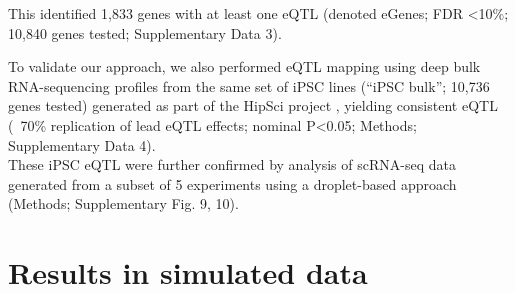 This identified 1,833 genes with at least one eQTL (denoted eGenes; FDR <10\%; 10,840 genes tested; Supplementary Data 3). 


To validate our approach, we also performed eQTL mapping using deep bulk RNA-sequencing profiles from the same set of iPSC lines (“iPSC bulk”; 10,736 genes tested) generated as part of the HipSci project \cite{kilpinen2017common}, yielding consistent eQTL (~70\% replication of lead eQTL effects; nominal P<0.05; Methods; Supplementary Data 4).\\ 

These iPSC eQTL were further confirmed by analysis of scRNA-seq data generated from a subset of 5 experiments using a droplet-based approach (Methods; Supplementary Fig. 9, 10).


\section{Results in simulated data}






